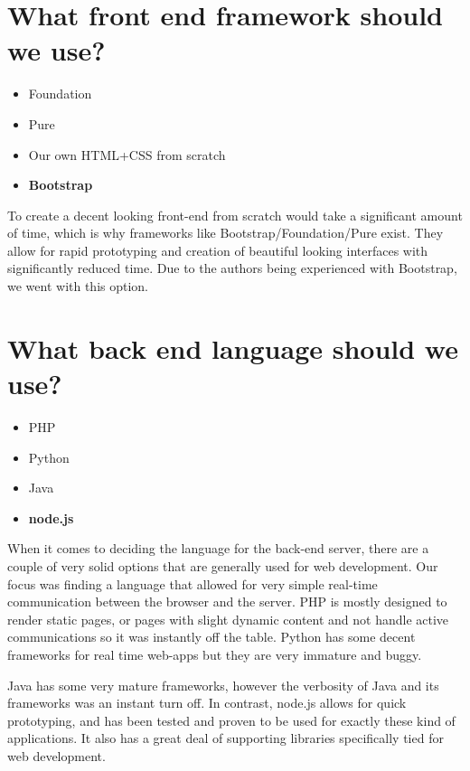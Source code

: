 \documentclass[12pt]{report}
\begin{document}
\section{What front end framework should we use?}
\begin{itemize}
    \item{Foundation}
    \item{Pure}
    \item{Our own HTML+CSS from scratch}
    \item\textbf{Bootstrap} 
\end{itemize}
To create a decent looking front-end from scratch would take a significant amount of time, which is why frameworks like Bootstrap/Foundation/Pure exist. They allow for rapid prototyping and creation of beautiful looking interfaces with significantly reduced time. Due to the authors being experienced with Bootstrap, we went with this option.

\section{What back end language should we use?}
\begin{itemize}
    \item{PHP}
    \item{Python}
    \item{Java}
    \item\textbf{node.js} 
\end{itemize}
When it comes to deciding the language for the back-end server, there are a couple of very solid options that are generally used for web development. Our focus was finding a language that allowed for very simple real-time communication between the browser and the server. PHP is mostly designed to render static pages, or pages with slight dynamic content and not handle active communications so it was instantly off the table. Python has some decent frameworks for real time web-apps but they are very immature and buggy. 

Java has some very mature frameworks, however the verbosity of Java and its frameworks was an instant turn off. In contrast, node.js allows for quick prototyping, and has been tested and proven to be used for exactly these kind of applications. It also has a great deal of supporting libraries specifically tied for web development.
\end{document}
